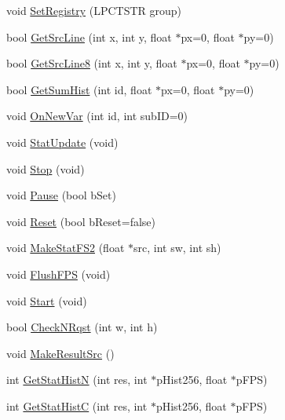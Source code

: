 \begin{DoxyCompactItemize}
\item 
void \hyperlink{class_c_v_i_engine_base_a4507f1ddf8b2931693f85e97dafe7cda}{Set\+Registry} (L\+P\+C\+T\+S\+T\+R group)
\item 
bool \hyperlink{class_c_v_i_engine_base_abcb53c55dac3fb076b4e8f5b88e48e6a}{Get\+Src\+Line} (int x, int y, float $\ast$px=0, float $\ast$py=0)
\item 
bool \hyperlink{class_c_v_i_engine_base_aaf9d381d837873e8c66babffa6f6bfd1}{Get\+Src\+Line8} (int x, int y, float $\ast$px=0, float $\ast$py=0)
\item 
bool \hyperlink{class_c_v_i_engine_base_a1e295decbf2fabf485467c2dee1bb51f}{Get\+Sum\+Hist} (int id, float $\ast$px=0, float $\ast$py=0)
\item 
void \hyperlink{class_c_v_i_engine_base_ad6e23a29501fa69951a0cc9405bae96a}{On\+New\+Var} (int id, int sub\+I\+D=0)
\item 
void \hyperlink{class_c_v_i_engine_base_a1fcb2c48c5d0f103dd1e001f8a4ec35f}{Stat\+Update} (void)
\item 
void \hyperlink{class_c_v_i_engine_base_ae3a9bb0a97a8ed3ac6e16980dc22a424}{Stop} (void)
\item 
void \hyperlink{class_c_v_i_engine_base_a2f426874bb7e7dfa183b7145dab79128}{Pause} (bool b\+Set)
\item 
void \hyperlink{class_c_v_i_engine_base_a27a3545d7253a59150ea9c16e7b4f0ac}{Reset} (bool b\+Reset=false)
\item 
void \hyperlink{class_c_v_i_engine_base_a4a2bee3b656476fdc3cb488a7019d7ae}{Make\+Stat\+F\+S2} (float $\ast$src, int sw, int sh)
\item 
void \hyperlink{class_c_v_i_engine_base_a7d2e5915b3c1c9f6172291305a99bfe5}{Flush\+F\+P\+S} (void)
\item 
void \hyperlink{class_c_v_i_engine_base_ab2c697a4748558b48789feca6a105042}{Start} (void)
\item 
bool \hyperlink{class_c_v_i_engine_base_a65b898d96c06c5c9bf9f388b4a70f740}{Check\+N\+Rqst} (int w, int h)
\item 
void \hyperlink{class_c_v_i_engine_base_ad231ab7aee4acfc00e9a55e778443ee4}{Make\+Result\+Src} ()
\item 
int \hyperlink{class_c_v_i_engine_base_a238c46a9344e280e609dcd974ce40a02}{Get\+Stat\+Hist\+N} (int res, int $\ast$p\+Hist256, float $\ast$p\+F\+P\+S)
\item 
int \hyperlink{class_c_v_i_engine_base_a8abf18dfc992c03f0dc9811be62ea5d5}{Get\+Stat\+Hist\+C} (int res, int $\ast$p\+Hist256, float $\ast$p\+F\+P\+S)

\end{DoxyCompactItemize}
